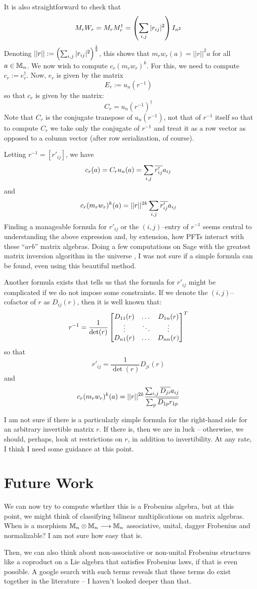 It is also straightforward to check that
\[
  M_rW_r = M_rM_r^{\dagger}
    = \left( \sum_{i, j} |r_{ij}|^2 \right)I_{n^2}
\]
Denoting $||r|| := \left( \sum_{i, j} |r_{ij}|^2 \right)^{\frac{1}{2}}$, this shows that
$m_rw_r(a) = ||r||^2a$ for all $a \in \mathbb{M}_n$. We now wish to compute
$c_r(m_rw_r)^k$. For this, we need to compute $c_r := e_r^{\dagger}$. Now,
$e_r$ is given by the matrix
\[
  E_r := u_n(r^{-1})
\]
so that $c_r$ is given by the matrix:
\[
  C_r = u_n(r^{-1})^{\dagger}
\]
Note that $C_r$ is the conjugate transpose of $u_n(r^{-1})$, not that of
$r^{-1}$ itself so that to compute $C_r$ we take only the conjugate of
$r^{-1}$ and treat it as a row vector as opposed to a column vector (after row
serialization, of course).

Letting $r^{-1} = [r'_{ij}]$, we have
\[
  c_r(a) = C_ru_n(a) = \sum_{i, j} \overline{r'_{ij}}a_{ij}
\]
and
\[
  c_r(m_rw_r)^k(a) = ||r||^{2k} \sum_{i, j} \overline{r'_{ij}}a_{ij}
\]
Finding a manageable formula for $r'_{ij}$ or the $(i, j)$--entry of $r^{-1}$
seems central to understanding the above expression and, by extension, how PFTs
interact with these ``$arb$'' matrix algebras. Doing a few computations on Sage
with the greatest matrix inversion algorithm in the universe
\cite{SteveInvFormula}, I was not sure if a simple formula can be found, even
using this beautiful method.

Another formula exists that tells us that the formula for $r'_{ij}$ might be
complicated if we do not impose some constraints. If we denote the
$(i, j)$--cofactor of $r$ as $D_{ij}(r)$, then it is well known that:
\[
  r^{-1} = \frac{1}{\det(r)}\begin{bmatrix} 
    D_{11}(r) & \dots   & D_{1n}(r) \\
    \vdots    & \ddots  & \vdots \\
    D_{n1}(r) & \dots   & D_{nn}(r)
   \end{bmatrix}^{T}
\]
so that
\[
  r'_{ij} = \frac{1}{\det(r)}D_{ji}(r)
\]
and
\[
  c_r(m_rw_r)^k(a) = ||r||^{2k} \frac{
      \sum_{i, j} \overline{D_{ji}}a_{ij}
    }{
      \sum_{p} \overline{D_{1p}r_{1p}}
    }
\]

I am not sure if there is a particularly simple formula for the right-hand side
for an arbitrary invertible matrix $r$. If there is, then we are in luck --
otherwise, we should, perhaps, look at restrictions on $r$, in addition to
invertibility. At any rate, I think I need some guidance at this point.

\section{Future Work}

We can now try to compute whether this is a Frobenius algebra, but at this
point, we might think of classifying bilinear multiplications on matrix
algebras. When is a morphism $\mathbb{M}_n \otimes \mathbb{M}_n \longrightarrow \mathbb{M}_n$ associative, unital,
dagger Frobenius and normalizable? I am not sure how easy that is.

Then, we can also think about non-associative or non-unital Frobenius structures
like a coproduct on a Lie algebra that satisfies Frobenius laws, if that is even
possible. A google search with such terms reveals that these terms do exist
together in the literature -- I haven't looked deeper than that.


